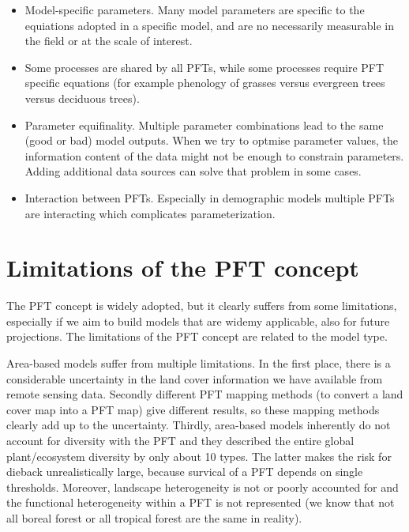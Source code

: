 \documentclass[12pt,oneside]{book}
\providecommand{\tightlist}{%
  \setlength{\itemsep}{0pt}\setlength{\parskip}{0pt}}
\begin{document}
\begin{itemize}
\tightlist
\item
  Model-specific parameters. Many model parameters are specific to the
  equiations adopted in a specific model, and are no necessarily
  measurable in the field or at the scale of interest.
\item
  Some processes are shared by all PFTs, while some processes require
  PFT specific equations (for example phenology of grasses versus
  evergreen trees versus deciduous trees).
\item
  Parameter equifinality. Multiple parameter combinations lead to the
  same (good or bad) model outputs. When we try to optmise parameter
  values, the information content of the data might not be enough to
  constrain parameters. Adding additional data sources can solve that
  problem in some cases.
\item
  Interaction between PFTs. Especially in demographic models multiple
  PFTs are interacting which complicates parameterization.
\end{itemize}

\section{Limitations of the PFT
concept}\label{limitations-of-the-pft-concept}

The PFT concept is widely adopted, but it clearly suffers from some
limitations, especially if we aim to build models that are widemy
applicable, also for future projections. The limitations of the PFT
concept are related to the model type.

Area-based models suffer from multiple limitations. In the first place,
there is a considerable uncertainty in the land cover information we
have available from remote sensing data. Secondly different PFT mapping
methods (to convert a land cover map into a PFT map) give different
results, so these mapping methods clearly add up to the uncertainty.
Thirdly, area-based models inherently do not account for diversity with
the PFT and they described the entire global plant/ecosystem diversity
by only about 10 types. The latter makes the risk for dieback
unrealistically large, because survical of a PFT depends on single
thresholds. Moreover, landscape heterogeneity is not or poorly accounted
for and the functional heterogeneity within a PFT is not represented (we
know that not all boreal forest or all tropical forest are the same in
reality).
\end{document}
